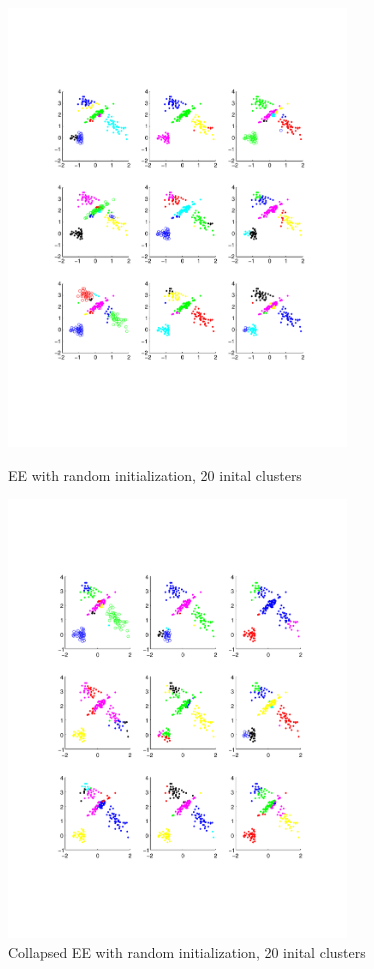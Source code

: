 \documentclass{article}
\begin{document}
\begin{figure}[h] 
  \begin{minipage}[b]{0.5\textwidth} 
    \centering 
    \includegraphics[width=0.8\textwidth]{BJ.pdf} 
    \caption{EE with random initialization, 20 inital clusters} 
    \label{fig:by:table} 
  \end{minipage}%
  \begin{minipage}[b]{0.5\textwidth} 
    \centering 
    \includegraphics[width=0.8\textwidth]{cdb.pdf} 
    \caption{Collapsed EE with random initialization, 20 inital clusters}
    \label{fig:by:table}  
   \end{minipage}%
   \end{figure}
\end{document}
